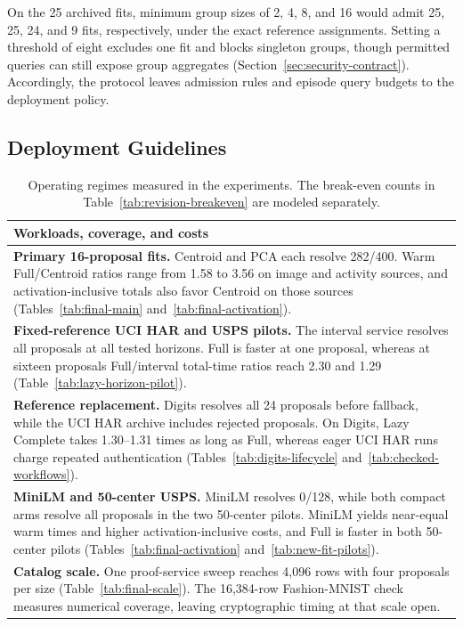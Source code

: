 \documentclass[5p,times,twocolumn]{elsarticle}
\begin{document}
On the 25 archived fits, minimum group sizes of 2, 4, 8, and 16 would admit 25, 25, 24, and 9 fits, respectively, under the exact reference assignments. Setting a threshold of eight excludes one fit and blocks singleton groups, though permitted queries can still expose group aggregates (Section~\ref{sec:security-contract}). Accordingly, the protocol leaves admission rules and episode query budgets to the deployment policy.

\subsection{Deployment Guidelines}
\begin{table}[H]
\centering\small
\caption{Operating regimes measured in the experiments. The break-even
counts in Table~\ref{tab:revision-breakeven} are modeled separately.}
\label{tab:deployment-summary}
\begin{tabularx}{\columnwidth}{@{}>{\raggedright\arraybackslash}X@{}}\toprule
Workloads, coverage, and costs\\\midrule
\textbf{Primary 16-proposal fits.} Centroid and PCA each resolve 282/400. Warm Full/Centroid ratios range from 1.58 to 3.56 on image and activity sources, and activation-inclusive totals also favor Centroid on those sources (Tables~\ref{tab:final-main} and~\ref{tab:final-activation}).\\
\addlinespace[2pt]
\textbf{Fixed-reference UCI HAR and USPS pilots.} The interval service resolves all proposals at all tested horizons. Full is faster at one proposal, whereas at sixteen proposals Full/interval total-time ratios reach 2.30 and 1.29 (Table~\ref{tab:lazy-horizon-pilot}).\\
\addlinespace[2pt]
\textbf{Reference replacement.} Digits resolves all 24 proposals before fallback, while the UCI HAR archive includes rejected proposals. On Digits, Lazy Complete takes 1.30--1.31 times as long as Full, whereas eager UCI HAR runs charge repeated authentication (Tables~\ref{tab:digits-lifecycle} and~\ref{tab:checked-workflows}).\\
\addlinespace[2pt]
\textbf{MiniLM and 50-center USPS.} MiniLM resolves 0/128, while both compact arms resolve all proposals in the two 50-center pilots. MiniLM yields near-equal warm times and higher activation-inclusive costs, and Full is faster in both 50-center pilots (Tables~\ref{tab:final-activation} and~\ref{tab:new-fit-pilots}).\\
\addlinespace[2pt]
\textbf{Catalog scale.} One proof-service sweep reaches 4,096 rows with four proposals per size (Table~\ref{tab:final-scale}). The 16,384-row Fashion-MNIST check measures numerical coverage, leaving cryptographic timing at that scale open.\\
\bottomrule
\end{tabularx}
\end{table}
\end{document}
